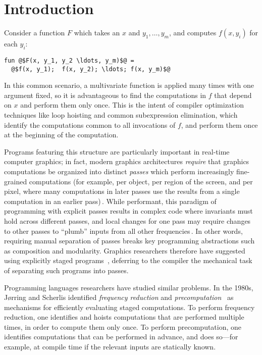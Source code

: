 \section{Introduction}
\label{sec:intro}

Consider a function $F$ which takes an $x$ and $y_1,\dots,y_m$, and computes
$f(x,y_i)$ for each $y_i$:
\begin{lstlisting}
fun @$F(x, y_1, y_2 \ldots, y_m)$@ = 
  @$f(x, y_1);  f(x, y_2); \ldots; f(x, y_m)$@
\end{lstlisting}
%
In this common scenario, a multivariate function is applied many times with one
argument fixed, so it is advantageous to find the computations in $f$ that
depend on $x$ and perform them only once. This is the intent of compiler
optimization techniques like loop hoisting and common subexpression elimination,
which identify the computations common to all invocations of $f$, and perform
them once at the beginning of the computation.

Programs featuring this structure are particularly important in real-time
computer graphics; in fact, modern graphics architectures \emph{require} that
graphics computations be organized into distinct {\em passes} which perform
increasingly fine-grained computations (for example, per object, per region of
the screen, and per pixel, where many computations in later passes use the
results from a single computation in an earlier pass)\,\cite{OpenGL4Spec}.
While performant, this paradigm of programming with explicit passes results in
complex code where invariants must hold across different passes, and local
changes for one pass may require changes to other passes to ``plumb'' inputs
from all other frequencies\,\cite{Foley:2011}.
%
In other words, requiring manual separation of passes breaks key programming
abstractions such as composition and modularity.
%
Graphics researchers therefore have suggested using explicitly staged programs
\,\cite{Proudfoot:2001,Foley:2011,He:2014}, deferring to the compiler the
mechanical task of separating such programs into passes.

Programming languages researchers have studied similar problems. In the 1980s,
J{\o}rring and Scherlis identified {\em frequency reduction} and {\em
precomputation}~\cite{JS86-staging} as mechanisms for efficiently evaluating
staged computations. To perform frequency reduction, one identifies and hoists
computations that are performed multiple times, in order to compute them only
once. To perform precomputation, one identifies computations that can be
performed in advance, and does so---for example, at compile time if the relevant
inputs are statically known.

